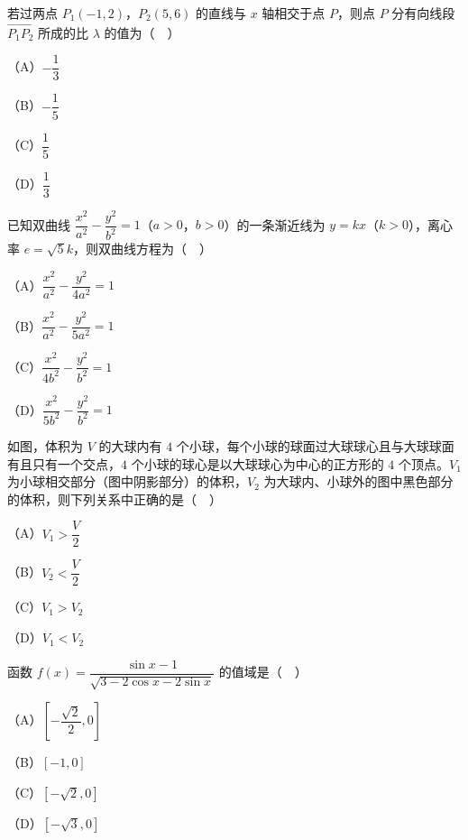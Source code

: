 \begin{question}
若过两点 $P_1(-1,2)$，$P_2(5,6)$ 的直线与 $x$ 轴相交于点 $P$，则点 $P$ 分有向线段 $\overrightarrow{P_1P_2}$ 所成的比 $\lambda$ 的值为（　）

（A）$-\dfrac13$

（B）$-\dfrac15$

（C）$\dfrac15$

（D）$\dfrac13$

\end{question}
\begin{question}
已知双曲线 $\dfrac{x^2}{a^2}-\dfrac{y^2}{b^2}=1$（$a>0$，$b>0$）的一条渐近线为 $y=kx$（$k>0$），离心率 $e=\sqrt5k$，则双曲线方程为（　）

（A）$\dfrac{x^2}{a^2}-\dfrac{y^2}{4a^2}=1$

（B）$\dfrac{x^2}{a^2}-\dfrac{y^2}{5a^2}=1$

（C）$\dfrac{x^2}{4b^2}-\dfrac{y^2}{b^2}=1$

（D）$\dfrac{x^2}{5b^2}-\dfrac{y^2}{b^2}=1$

\Needspace{0.4\textheight}
\end{question}
\begin{question}
如图，体积为 $V$ 的大球内有 $4$ 个小球，每个小球的球面过大球球心且与大球球面有且只有一个交点，$4$ 个小球的球心是以大球球心为中心的正方形的 $4$ 个顶点。$V_1$ 为小球相交部分（图中阴影部分）的体积，$V_2$ 为大球内、小球外的图中黑色部分的体积，则下列关系中正确的是（　）

（A）$V_1>\dfrac V2$

（B）$V_2<\dfrac V2$

（C）$V_1>V_2$

（D）$V_1<V_2$
\nopagebreak[4]
\begin{center}\end{center}
\nopagebreak[4]
\end{question}
\begin{question}
函数 $f(x)=\dfrac{\sin x-1}{\sqrt{3-2\cos x-2\sin x}}$ 的值域是（　）

（A）$\left[-\dfrac{\sqrt2}2,0\right]$

（B）$[-1,0]$

（C）$[-\sqrt2,0]$

（D）$[-\sqrt3,0]$

\end{question}


